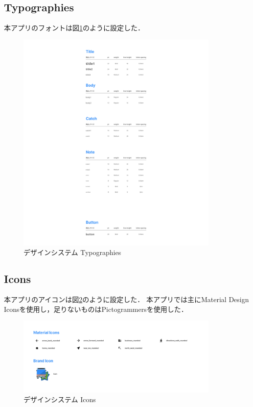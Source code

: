 \subsection{Typographies}
    本アプリのフォントは図\ref{fig:typographies}のように設定した．
    \pagebreak
    \begin{figure}
        \centering
        \includegraphics[width=10cm]{images/typographies.png}
        \caption{デザインシステム Typographies}
        \label{fig:typographies}
    \end{figure}
\subsection{Icons}
    本アプリのアイコンは図\ref{fig:icons}のように設定した．
    本アプリでは主にMaterial Design Iconsを使用し，足りないものはPictogrammersを使用した．
        \pagebreak
        \begin{figure}
            \centering
            \includegraphics[width=10cm]{images/icons.png}
            \caption{デザインシステム Icons}
            \label{fig:icons}
        \end{figure}

